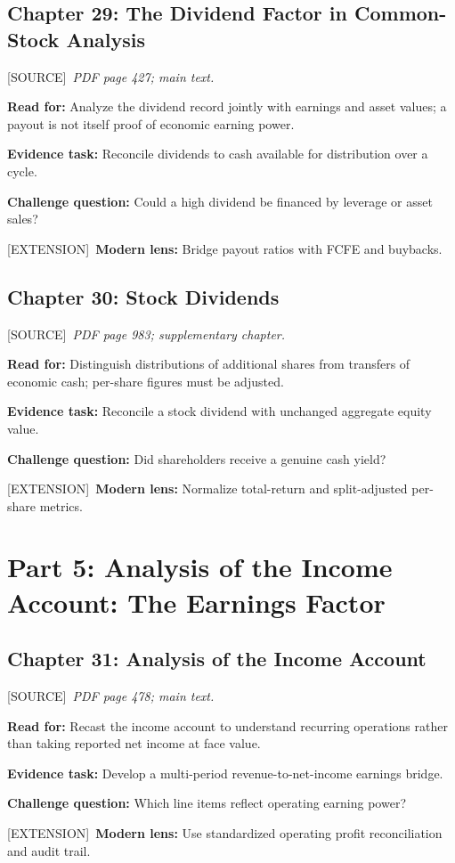 \documentclass[11pt,letterpaper]{article}
\newcommand{\src}{\textsf{\color{sea}[SOURCE]}}
\newcommand{\ext}{\textsf{\color{gold}[EXTENSION]}}
\begin{document}
\subsection{Chapter 29: The Dividend Factor in Common-Stock Analysis}
\src\ \textit{PDF page 427; main text.}\par
\textbf{Read for:} Analyze the dividend record jointly with earnings and asset values; a payout is not itself proof of economic earning power.\par
\textbf{Evidence task:} Reconcile dividends to cash available for distribution over a cycle.\par
\textbf{Challenge question:} Could a high dividend be financed by leverage or asset sales?\par
\ext\ \textbf{Modern lens:} Bridge payout ratios with FCFE and buybacks.\par

\subsection{Chapter 30: Stock Dividends}
\src\ \textit{PDF page 983; supplementary chapter.}\par
\textbf{Read for:} Distinguish distributions of additional shares from transfers of economic cash; per-share figures must be adjusted.\par
\textbf{Evidence task:} Reconcile a stock dividend with unchanged aggregate equity value.\par
\textbf{Challenge question:} Did shareholders receive a genuine cash yield?\par
\ext\ \textbf{Modern lens:} Normalize total-return and split-adjusted per-share metrics.\par

\section{Part 5: Analysis of the Income Account: The Earnings Factor}

\subsection{Chapter 31: Analysis of the Income Account}
\src\ \textit{PDF page 478; main text.}\par
\textbf{Read for:} Recast the income account to understand recurring operations rather than taking reported net income at face value.\par
\textbf{Evidence task:} Develop a multi-period revenue-to-net-income earnings bridge.\par
\textbf{Challenge question:} Which line items reflect operating earning power?\par
\ext\ \textbf{Modern lens:} Use standardized operating profit reconciliation and audit trail.\par
\end{document}
